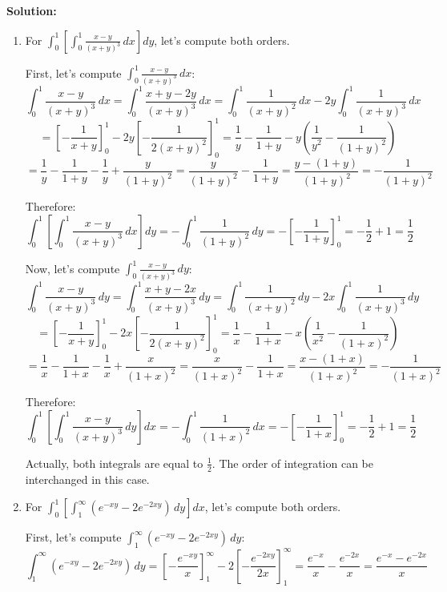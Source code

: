 \noindent\textbf{Solution:}
\begin{enumerate}[label=(\alph*)]
    \item For $\int_{0}^{1} \left[ \int_{0}^{1} \frac{x - y}{(x + y)^{3}} \, dx \right] dy$, let's compute both orders.
    
    First, let's compute $\int_{0}^{1} \frac{x - y}{(x + y)^{3}} \, dx$:
    \[\int_{0}^{1} \frac{x - y}{(x + y)^{3}} \, dx = \int_{0}^{1} \frac{x + y - 2y}{(x + y)^{3}} \, dx = \int_{0}^{1} \frac{1}{(x + y)^{2}} \, dx - 2y \int_{0}^{1} \frac{1}{(x + y)^{3}} \, dx\]
    \[= \left[-\frac{1}{x + y}\right]_{0}^{1} - 2y \left[-\frac{1}{2(x + y)^{2}}\right]_{0}^{1} = \frac{1}{y} - \frac{1}{1 + y} - y\left(\frac{1}{y^{2}} - \frac{1}{(1 + y)^{2}}\right)\]
    \[= \frac{1}{y} - \frac{1}{1 + y} - \frac{1}{y} + \frac{y}{(1 + y)^{2}} = \frac{y}{(1 + y)^{2}} - \frac{1}{1 + y} = \frac{y - (1 + y)}{(1 + y)^{2}} = -\frac{1}{(1 + y)^{2}}\]
    
    Therefore:
    \[\int_{0}^{1} \left[ \int_{0}^{1} \frac{x - y}{(x + y)^{3}} \, dx \right] dy = -\int_{0}^{1} \frac{1}{(1 + y)^{2}} \, dy = -\left[-\frac{1}{1 + y}\right]_{0}^{1} = -\frac{1}{2} + 1 = \frac{1}{2}\]
    
    Now, let's compute $\int_{0}^{1} \frac{x - y}{(x + y)^{3}} \, dy$:
    \[\int_{0}^{1} \frac{x - y}{(x + y)^{3}} \, dy = \int_{0}^{1} \frac{x + y - 2x}{(x + y)^{3}} \, dy = \int_{0}^{1} \frac{1}{(x + y)^{2}} \, dy - 2x \int_{0}^{1} \frac{1}{(x + y)^{3}} \, dy\]
    \[= \left[-\frac{1}{x + y}\right]_{0}^{1} - 2x \left[-\frac{1}{2(x + y)^{2}}\right]_{0}^{1} = \frac{1}{x} - \frac{1}{1 + x} - x\left(\frac{1}{x^{2}} - \frac{1}{(1 + x)^{2}}\right)\]
    \[= \frac{1}{x} - \frac{1}{1 + x} - \frac{1}{x} + \frac{x}{(1 + x)^{2}} = \frac{x}{(1 + x)^{2}} - \frac{1}{1 + x} = \frac{x - (1 + x)}{(1 + x)^{2}} = -\frac{1}{(1 + x)^{2}}\]
    
    Therefore:
    \[\int_{0}^{1} \left[ \int_{0}^{1} \frac{x - y}{(x + y)^{3}} \, dy \right] dx = -\int_{0}^{1} \frac{1}{(1 + x)^{2}} \, dx = -\left[-\frac{1}{1 + x}\right]_{0}^{1} = -\frac{1}{2} + 1 = \frac{1}{2}\]
    
    Actually, both integrals are equal to $\frac{1}{2}$. The order of integration can be interchanged in this case.
    
    \item For $\int_{0}^{1} \left[ \int_{1}^{\infty} (e^{-xy} - 2e^{-2xy}) \, dy \right] dx$, let's compute both orders.
    
    First, let's compute $\int_{1}^{\infty} (e^{-xy} - 2e^{-2xy}) \, dy$:
    \[\int_{1}^{\infty} (e^{-xy} - 2e^{-2xy}) \, dy = \left[-\frac{e^{-xy}}{x}\right]_{1}^{\infty} - 2\left[-\frac{e^{-2xy}}{2x}\right]_{1}^{\infty} = \frac{e^{-x}}{x} - \frac{e^{-2x}}{x} = \frac{e^{-x} - e^{-2x}}{x}\]
    

\end{enumerate}
